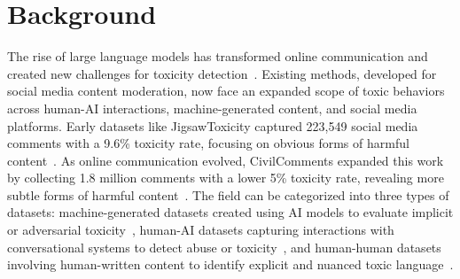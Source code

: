 \section{Background}
\begin{table}[ht] \centering  \vspace{0.25cm} \caption{Overview of various toxicity detection datasets with attributes such as number of samples, context, toxicity rate, label type, and category} \label{tab:toxicity_datasets} \end{table}
The rise of large language models has transformed online communication and created new challenges for toxicity detection~\cite{rtp, ToxicChat}. Existing methods, developed for social media content moderation, now face an expanded scope of toxic behaviors across human-AI interactions, machine-generated content, and social media platforms. Early datasets like JigsawToxicity captured 223,549 social media comments with a 9.6\% toxicity rate, focusing on obvious forms of harmful content~\cite{jigsaw}. As online communication evolved, CivilComments expanded this work by collecting 1.8 million comments with a lower 5\% toxicity rate, revealing more subtle forms of harmful content~\cite{civilcomments}. The field can be categorized into three types of datasets: machine-generated datasets created using AI models to evaluate implicit or adversarial toxicity~\cite{hartvigsen2022toxigenlargescalemachinegenerateddataset, wen2023unveilingimplicittoxicitylarge}, human-AI datasets capturing interactions with conversational systems to detect abuse or toxicity~\cite{ToxicChat, cercas-curry-etal-2021-convabuse}, and human-human datasets involving human-written content to identify explicit and nuanced toxic language~\cite{civilcomments, jigsaw}.
